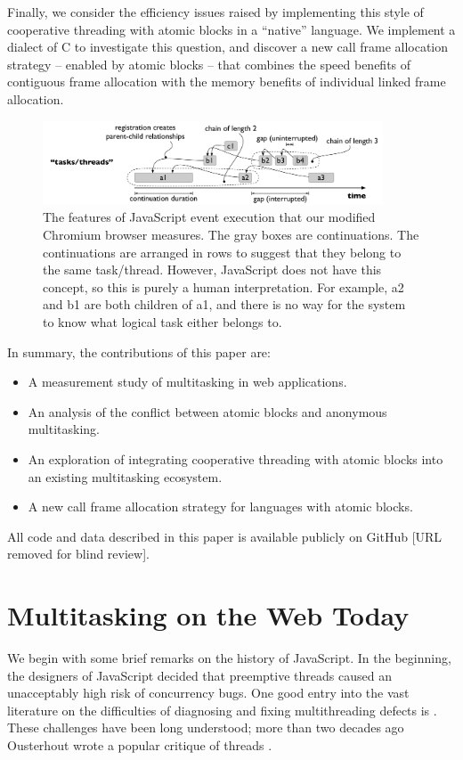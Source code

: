 \documentclass[acmsmall,anonymous,review]{acmart}\settopmatter{printfolios=true,printccs=false,printacmref=false}
\begin{document}
Finally, we consider the efficiency issues raised by implementing this style of cooperative threading with atomic blocks in a ``native'' language.
We implement a dialect of C to investigate this question, and discover a new call frame allocation strategy -- enabled by atomic blocks -- that combines the speed benefits of contiguous frame allocation with the memory benefits of individual linked frame allocation.

\begin{figure}
\includegraphics[width=0.9\textwidth]{continuation_tree}
\caption{The features of JavaScript event execution that our modified Chromium browser measures.
  The gray boxes are continuations.
  The continuations are arranged in rows to suggest that they belong to the same task/thread.
  However, JavaScript does not have this concept, so this is purely a human interpretation.
  For example, a2 and b1 are both children of a1, and there is no way for the system to know what logical task either belongs to.}
\label{fig:continuation_tree}
\end{figure}

In summary, the contributions of this paper are:
\begin{itemize}
\item A measurement study of multitasking in web applications.
\item An analysis of the conflict between atomic blocks and anonymous multitasking.
\item An exploration of integrating cooperative threading with atomic blocks into an existing multitasking ecosystem.
\item A new call frame allocation strategy for languages with atomic blocks.
\end{itemize}

All code and data described in this paper is available publicly on GitHub [URL removed for blind review].

\section{Multitasking on the Web Today}

We begin with some brief remarks on the history of JavaScript.
In the beginning, the designers of JavaScript decided that preemptive threads caused an unacceptably high risk of concurrency bugs.
One good entry into the vast literature on the difficulties of diagnosing and fixing multithreading defects is \cite{Lu2008}.
These challenges have been long understood; more than two decades ago Ousterhout wrote a popular critique of threads \cite{Ousterhout1996}.
\end{document}
